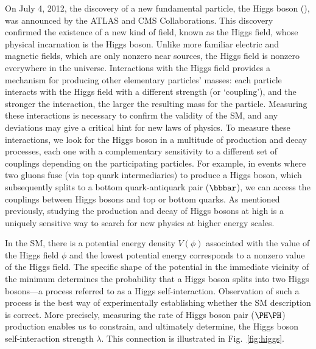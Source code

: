\documentclass[11pt,letterpaper,notitlepage]{article}
\begin{document}
On July 4, 2012, the discovery of a new fundamental particle, the Higgs boson (\PH), was announced by the ATLAS and CMS Collaborations.
This discovery confirmed the existence of a new kind of field, known as the Higgs field, whose physical incarnation is the Higgs boson.
Unlike more familiar electric and magnetic fields, which are only nonzero near sources, the Higgs field is nonzero everywhere in the universe.
Interactions with the Higgs field provides a mechanism for producing other elementary particles' masses: each particle interacts with the Higgs field with a different strength (or `coupling'), and the stronger the interaction, the larger the resulting mass for the particle.
Measuring these interactions is necessary to confirm the validity of the SM, and any deviations may give a critical hint for new laws of physics.
To measure these interactions, we look for the Higgs boson in a multitude of production and decay processes, each one with a complementary sensitivity to a different set of couplings depending on the participating particles.
For example, in events where two gluons fuse (via top quark intermediaries) to produce a Higgs boson, which subsequently splits to a bottom quark-antiquark pair ($\bbbar$), we can access the couplings between Higgs bosons and top or bottom quarks.
As mentioned previously, studying the production and decay of Higgs bosons at high \pt is a uniquely sensitive way to search for new physics at higher energy scales.

In the SM, there is a potential energy density $V(\phi)$ associated with the value of the Higgs field $\phi$ and the lowest potential energy corresponds to a nonzero value of the Higgs field.
The specific shape of the potential in the immediate vicinity of the minimum determines the probability that a Higgs boson splits into two Higgs bosons---a process referred to as a Higgs self-interaction.
Observation of such a process is the best way of experimentally establishing whether the SM description is correct.
More precisely, measuring the rate of Higgs boson pair ($\PH\PH$) production enables us to constrain, and ultimately determine, the Higgs boson self-interaction strength $\lambda$.
This connection is illustrated in Fig.~\ref{fig:higgs}.
\end{document}
